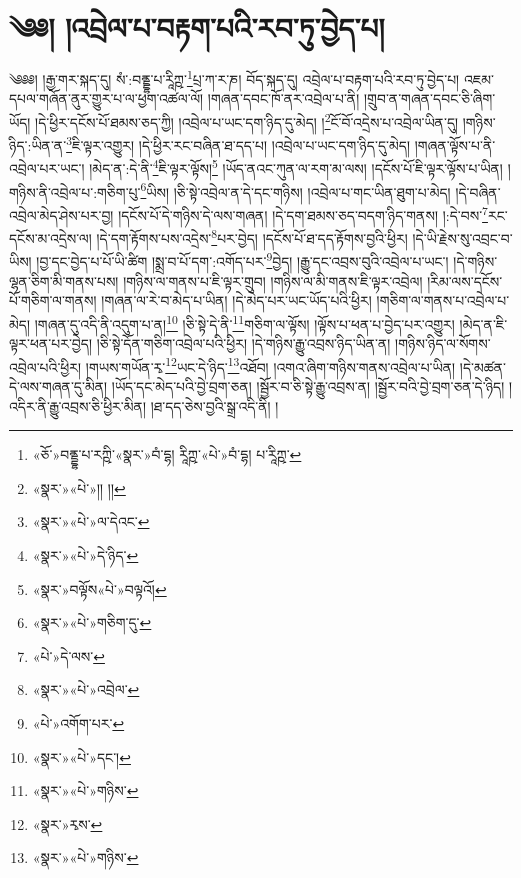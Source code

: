 \chapter{༄༅། །འབྲེལ་པ་བརྟག་པའི་རབ་ཏུ་བྱེད་པ།}༄༅༅། །རྒྱ་གར་སྐད་དུ། སཾ་:བནྡྷ་པ་རཱིཀྵ་\footnote{«ཅོ་»བནྡྷ་པ་རཀྵི་«སྣར་»བཾ་དྷ། རཱིཀྵ་«པེ་»བཾ་དྷ། པ་རཱིཀྵ་}པྲ་ཀ་ར་ཎ། བོད་སྐད་དུ། འབྲེལ་པ་བརྟག་པའི་རབ་ཏུ་བྱེད་པ། འཇམ་དཔལ་གཞོན་ནུར་གྱུར་པ་ལ་ཕྱག་འཚལ་ལོ། །གཞན་དབང་ཁོ་ནར་འབྲེལ་པ་ནི། །གྲུབ་ན་གཞན་དབང་ཅི་ཞིག་ཡོད། །དེ་ཕྱིར་དངོས་པོ་ཐམས་ཅད་ཀྱི། །འབྲེལ་པ་ཡང་དག་ཉིད་དུ་མེད། །\footnote{«སྣར་»«པེ་»།། །།}ངོ་བོ་འདྲེས་པ་འབྲེལ་ཡིན་དུ། །གཉིས་ཉིད་:ཡིན་ན་\footnote{«སྣར་»«པེ་»ལ་དེའང་}ཇི་ལྟར་འགྱུར། །དེ་ཕྱིར་རང་བཞིན་ཐ་དད་པ། །འབྲེལ་པ་ཡང་དག་ཉིད་དུ་མེད། །གཞན་ལྟོས་པ་ནི་འབྲེལ་པར་ཡང་། །མེད་ན་:དེ་ནི་\footnote{«སྣར་»«པེ་»དེ་ཉིད་}ཇི་ལྟར་ལྟོས།\footnote{«སྣར་»བལྟོས«པེ་»བལྟའོ།} །ཡོད་ནའང་ཀུན་ལ་རག་མ་ལས། །དངོས་པོ་ཇི་ལྟར་ལྟོས་པ་ཡིན། །གཉིས་ནི་འབྲེལ་པ་:གཅིག་པུ་\footnote{«སྣར་»«པེ་»གཅིག་དུ་}ཡིས། །ཅི་སྟེ་འབྲེལ་ན་དེ་དང་གཉིས། །འབྲེལ་པ་གང་ཡིན་ཐུག་པ་མེད། །དེ་བཞིན་འབྲེལ་མེད་ཤེས་པར་བྱ། །དངོས་པོ་དེ་གཉིས་དེ་ལས་གཞན། །དེ་དག་ཐམས་ཅད་བདག་ཉིད་གནས། །:དེ་བས་\footnote{«པེ་»དེ་ལས་}རང་དངོས་མ་འདྲེས་ལ། །དེ་དག་རྟོགས་པས་འདྲེས་\footnote{«སྣར་»«པེ་»འབྲེལ་}པར་བྱེད། །དངོས་པོ་ཐ་དད་རྟོགས་བྱའི་ཕྱིར། །དེ་ཡི་རྗེས་སུ་འབྲང་བ་ཡིས། །བྱ་དང་བྱེད་པ་པོ་ཡི་ཚིག །སྨྲ་བ་པོ་དག་:འགོད་པར་\footnote{«པེ་»འགོག་པར་}བྱེད། །རྒྱུ་དང་འབྲས་བུའི་འབྲེལ་པ་ཡང་། །དེ་གཉིས་ལྷན་ཅིག་མི་གནས་པས། །གཉིས་ལ་གནས་པ་ཇི་ལྟར་གྲུབ། །གཉིས་ལ་མི་གནས་ཇི་ལྟར་འབྲེལ། །རིམ་ལས་དངོས་པོ་གཅིག་ལ་གནས། །གཞན་ལ་རེ་བ་མེད་པ་ཡིན། །དེ་མེད་པར་ཡང་ཡོད་པའི་ཕྱིར། །གཅིག་ལ་གནས་པ་འབྲེལ་པ་མེད། །གཞན་དུ་འདི་ནི་འདུག་པ་ན།\footnote{«སྣར་»«པེ་»དང་།} །ཅི་སྟེ་དེ་ནི་\footnote{«སྣར་»«པེ་»གཉིས་}གཅིག་ལ་ལྟོས། །ལྟོས་པ་ཕན་པ་བྱེད་པར་འགྱུར། །མེད་ན་ཇི་ལྟར་ཕན་པར་བྱེད། །ཅི་སྟེ་དོན་གཅིག་འབྲེལ་པའི་ཕྱིར། །དེ་གཉིས་རྒྱུ་འབྲས་ཉིད་ཡིན་ན། །གཉིས་ཉིད་ལ་སོགས་འབྲེལ་པའི་ཕྱིར། །གཡས་གཡོན་རྭ་\footnote{«སྣར་»རྭས་}ཡང་དེ་ཉིད་\footnote{«སྣར་»«པེ་»གཉིས་}འཐོབ། །འགའ་ཞིག་གཉིས་གནས་འབྲེལ་པ་ཡིན། །དེ་མཚན་དེ་ལས་གཞན་དུ་མིན། །ཡོད་དང་མེད་པའི་བྱེ་བྲག་ཅན། །སྦྱོར་བ་ཅི་སྟེ་རྒྱུ་འབྲས་ན། །སྦྱོར་བའི་བྱེ་བྲག་ཅན་དེ་ཉིད། །འདིར་ནི་རྒྱུ་འབྲས་ཅི་ཕྱིར་མིན། །ཐ་དད་ཅེས་བྱའི་སྒྲ་འདི་ནི། །
